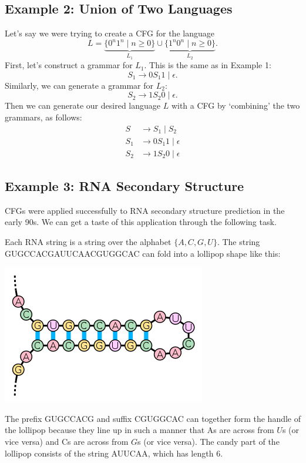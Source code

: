 \documentclass{article}
\begin{document}
\subsection*{Example 2: Union of Two Languages}
    Let's say we were trying to create a CFG for the language $$L = \underbrace{\{0^{n}1^{n} \mid n \ge 0\}}_{L_{1}} \cup \underbrace{\{1^{n}0^{n} \mid n \ge 0\}}_{L_{2}}.$$ First, let's construct a grammar for $L_{1}$. This is the same as in Example 1: $$S_{1} \rightarrow 0S_{1}1 \mid \epsilon.$$ Similarly, we can generate a grammar for $L_{2}$: $$S_{2} \rightarrow 1S_{2}0 \mid \epsilon.$$ Then we can generate our desired language $L$ with a CFG by `combining' the two grammars, as follows:
    \begin{align*}
        S &\rightarrow S_{1} \mid S_{2} \\
        S_{1} &\rightarrow 0S_{1}1 \mid \epsilon \\
        S_{2} &\rightarrow 1S_{2}0 \mid \epsilon
    \end{align*}

\subsection*{Example 3: RNA Secondary Structure}
        CFGs were applied successfully to RNA secondary structure prediction in the early 90s. We can get a taste of this application through the following task.
        
        \qquad Each RNA string is a string over the alphabet $\{A, C, G, U\}$. The string GUGCCACGAUUCAACGUGGCAC can fold into a lollipop shape like this:
        \begin{center}
            \includegraphics[scale = 0.4]{images/stem-loop.png}
        \end{center}
        \qquad The prefix GUGCCACG and suffix CGUGGCAC can together form the handle of the lollipop because they line up in such a manner that As are across from $U$s (or vice versa) and Cs are across from $G$s (or vice versa). The candy part of the lollipop consists of the string AUUCAA, which has length 6.
\end{document}
